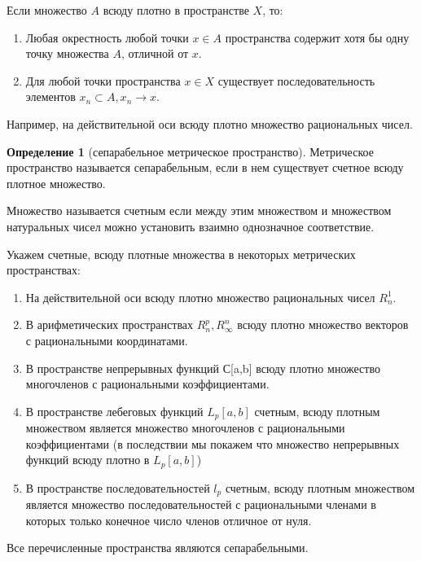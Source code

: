 \documentclass[14pt,a4paper]{extarticle}
\theoremstyle{definition}
\newtheorem{definition}{Определение}[section]
\theoremstyle{remark}
\renewcommand{\[}{\begin{dmath*}[compact]}
\renewcommand{\]}{\end{dmath*}}
\newcommand{\be}{\begin{enumerate}}
\newcommand{\ee}{\end{enumerate}}
\begin{document}
Если множество $A$ всюду плотно в пространстве $X$, то:

\be
  \item Любая окрестность любой точки $x \in A$ пространства содержит хотя
  бы одну точку множества $A$, отличной от $x$.

  \item Для любой точки пространства $x \in X$  существует последовательность
  элементов ${x_n} \subset A, x_n \to x$.
\ee

Например, на действительной оси всюду плотно множество рациональных чисел.

\begin{definition}[сепарабельное метрическое пространство]
  Метрическое пространство называется сепарабельным,
  если в нем существует счетное всюду плотное множество.
\end{definition}

Множество называется счетным если между этим множеством и множеством
натуральных чисел можно установить взаимно однозначное соответствие.

Укажем счетные, всюду плотные множества в некоторых метрических пространствах:

\begin{enumerate}
  \item На действительной оси всюду плотно множество рациональных чисел $R_n^1$.

  \item В арифметических пространствах $R_n^p, R_\infty^n$ всюду плотно
  множество векторов с рациональными координатами.

  \item В пространстве непрерывных функций С[a,b] всюду плотно множество
  многочленов с рациональными коэффициентами.

  \item В пространстве лебеговых функций $L_p[a,b]$ счетным, всюду плотным
  множеством является множество многочленов с рациональными коэффициентами (в
  последствии мы покажем что множество непрерывных функций всюду плотно в
  $L_p[a,b]$) %

  \item В пространстве последовательностей $l_p$ счетным, всюду плотным
  множеством является множество последовательностей с рациональными членами в
  которых только конечное число членов отличное от нуля. %
\end{enumerate}

Все перечисленные пространства являются сепарабельными.
\end{document}
